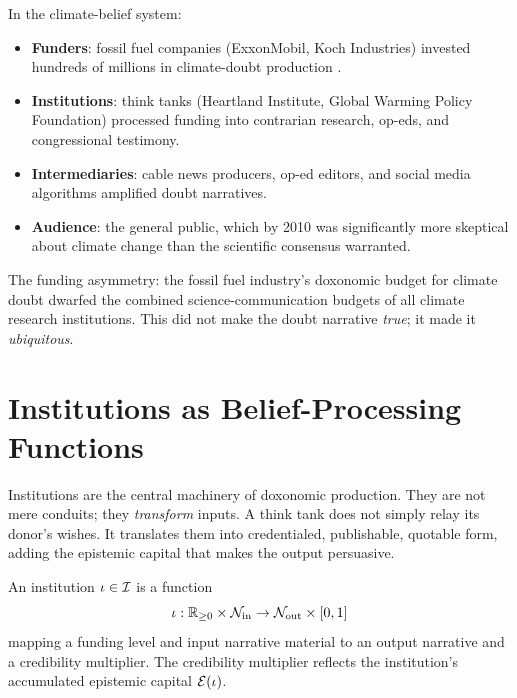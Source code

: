 \begin{example}
\label{ex:climate-agents}
In the climate-belief system:
\begin{itemize}[nosep]
  \item \textbf{Funders}: fossil fuel companies (ExxonMobil, Koch Industries) invested hundreds of millions in climate-doubt production \autocite{oreskes2010}.
  \item \textbf{Institutions}: think tanks (Heartland Institute, Global Warming Policy Foundation) processed funding into contrarian research, op-eds, and congressional testimony.
  \item \textbf{Intermediaries}: cable news producers, op-ed editors, and social media algorithms amplified doubt narratives.
  \item \textbf{Audience}: the general public, which by 2010 was significantly more skeptical about climate change than the scientific consensus warranted.
\end{itemize}
The funding asymmetry: the fossil fuel industry's doxonomic budget for climate doubt dwarfed the combined science-communication budgets of all climate research institutions.
This did not make the doubt narrative \emph{true}; it made it \emph{ubiquitous}.
\end{example}


\section{Institutions as Belief-Processing Functions}
\label{sec:ch4-institutions}

Institutions are the central machinery of doxonomic production.
They are not mere conduits; they \emph{transform} inputs.
A think tank does not simply relay its donor's wishes.
It translates them into credentialed, publishable, quotable form, adding the epistemic capital that makes the output persuasive.

\begin{definition}
\label{def:institution-function}
An institution $\iota \in \mathcal{I}$ is a function
\[
  \iota: \mathbb{R}_{\geq 0} \times \mathcal{N}_{\text{in}} \to \mathcal{N}_{\text{out}} \times [0,1]
\]
mapping a funding level and input narrative material to an output narrative and a credibility multiplier.
The credibility multiplier reflects the institution's accumulated epistemic capital $\mathcal{E}(\iota)$.
\end{definition}

